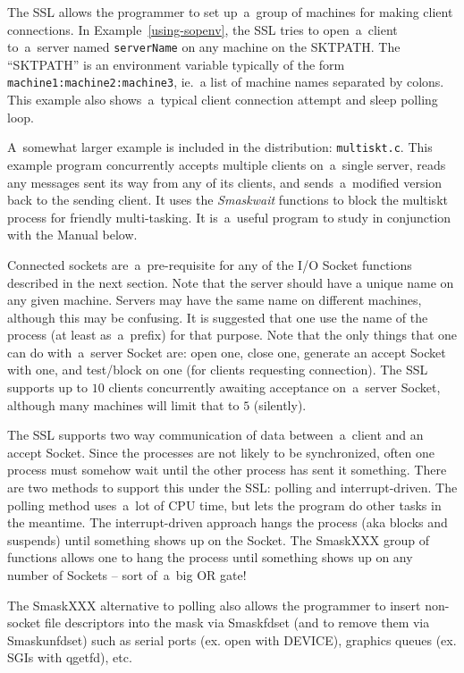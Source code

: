 \documentclass[12pt]{article}
\def\SSL{{\small SSL}}
\begin{document}
The {\SSL} allows the programmer to set up~a~group of machines for making client
connections.  In Example~\ref{using-sopenv}, the {\SSL} tries to open~a~client
to~a~server named \verb`serverName` on any machine on the {\small SKTPATH}.
The ``{\small SKTPATH}'' is an environment variable typically of the form
\verb`machine1:machine2:machine3`, ie.~a list of machine names separated by
colons.  This example also shows~a~typical client connection attempt and sleep
polling loop.

A~somewhat larger example is included in the distribution: \verb`multiskt.c`.
This example program concurrently accepts multiple clients on~a~single server,
reads any messages sent its way from any of its clients, and sends~a~modified
version back to the sending client.  It uses the {\em Smaskwait} functions to
block the multiskt process for friendly multi-tasking.  It is~a~useful program
to study in conjunction with the Manual below.

Connected sockets are~a~pre-requisite for any of the {\small I/O} Socket
functions described in the next section.  Note that the server should have a
unique name on any given machine. Servers may have the same name on different
machines, although this may be confusing.  It is suggested that one use the
name of the process (at least as~a~prefix) for that purpose.  Note that the
only things that one can do with~a~server Socket are: open one, close one,
generate an accept Socket with one, and test/block on one (for clients
requesting connection).  The {\SSL} supports up to $10$ clients concurrently
awaiting acceptance on~a~server Socket, although many machines will limit
that to $5$ (silently).

The {\SSL} supports two way communication of data between~a~client and an accept
Socket.  Since the processes are not likely to be synchronized, often one
process must somehow wait until the other process has sent it something.  There
are two methods to support this under the \SSL: polling and interrupt-driven.
The polling method uses~a~lot of {\small CPU} time, but lets the program do
other tasks in the meantime.  The interrupt-driven approach hangs the process
(aka blocks and suspends) until something shows up on the Socket.  The
Smask{\small XXX} group of functions allows one to hang the process until
something shows up on any number of Sockets -- sort of~a~big {\small OR} gate!

The Smask{\small XXX} alternative to polling also allows the programmer to
insert non-socket file descriptors into the mask via Smaskfdset (and to remove
them via Smaskunfdset) such as serial ports (ex. open with DEVICE), graphics queues
(ex. {\small SGI}s with qgetfd), etc.
\end{document}
